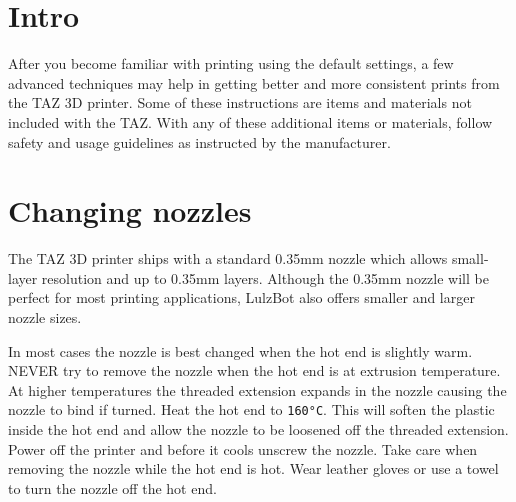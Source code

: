 %
%
%
%
%
%

\section{Intro}
After you become familiar with printing using the default settings, a few advanced techniques may help in getting better and more consistent prints from the TAZ 3D printer. Some of these instructions are items and materials not included with the TAZ. With any of these additional items or materials, follow safety and usage guidelines as instructed by the manufacturer.

\section{Changing nozzles}
The TAZ 3D printer ships with a standard 0.35mm nozzle which allows small-layer resolution and up to 0.35mm layers. Although the 0.35mm nozzle will be perfect for most printing applications, LulzBot also offers smaller and larger nozzle sizes.

In most cases the nozzle is best changed when the hot end is slightly warm. NEVER try to remove the nozzle when the hot end is at extrusion temperature. At higher temperatures the threaded extension expands in the nozzle causing the nozzle to bind if turned. Heat the hot end to \texttt{160°C}. This will soften the plastic inside the hot end and allow the nozzle to be loosened off the threaded extension. Power off the printer and before it cools unscrew the nozzle. Take care when removing the nozzle while the hot end is hot. Wear leather gloves or use a towel to turn the nozzle off the hot end.

